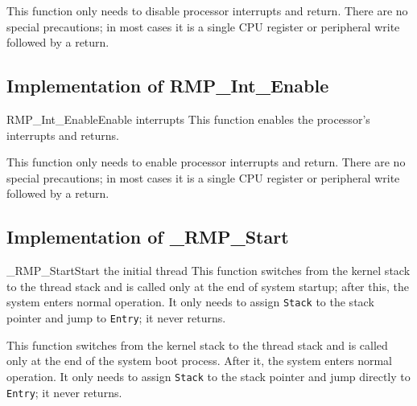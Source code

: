 This function only needs to disable processor interrupts and return.
There are no special precautions; in most cases it is a single CPU register or peripheral write followed by a return.

\subsection{Implementation of RMP\_Int\_Enable}
\begin{apidesc}{RMP\_Int\_Enable}{Enable interrupts}\label{api:RMP_Int_Enable}
    This function enables the processor's interrupts and returns.
    \begin{apiparams}
    \end{apiparams}
    \begin{apiret}
    \end{apiret}
\end{apidesc}

This function only needs to enable processor interrupts and return.
There are no special precautions; in most cases it is a single CPU register or peripheral write followed by a return.

\subsection{Implementation of \_RMP\_Start}
\begin{apidesc}{\_RMP\_Start}{Start the initial thread}\label{api:_RMP_Start}
    This function switches from the kernel stack to the thread stack and is called only at the end of system startup; after this, the system enters normal operation.
    It only needs to assign \texttt{Stack} to the stack pointer and jump to \texttt{Entry}; it never returns.
    \begin{apiparams}
    \end{apiparams}
    \begin{apiret}
    \end{apiret}
\end{apidesc}

This function switches from the kernel stack to the thread stack and is called only at the end of the system boot process.
After it, the system enters normal operation.
It only needs to assign \texttt{Stack} to the stack pointer and jump directly to \texttt{Entry}; it never returns.

